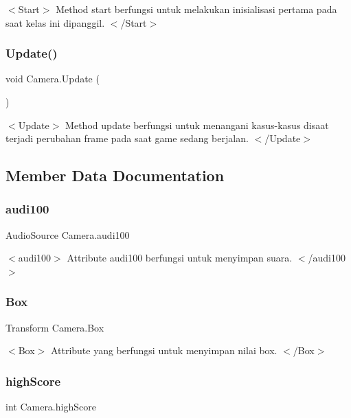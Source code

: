 $<$\+Start$>$ Method start berfungsi untuk melakukan inisialisasi pertama pada saat kelas ini dipanggil. $<$/\+Start$>$ \hypertarget{class_camera_a0dd18d8bd55c82e18a9ef12b036eedab}{}\label{class_camera_a0dd18d8bd55c82e18a9ef12b036eedab} 
\subsubsection{\texorpdfstring{Update()}{Update()}}
{\footnotesize\ttfamily void Camera.\+Update (\begin{DoxyParamCaption}{ }\end{DoxyParamCaption})\hspace{0.3cm}{\ttfamily [private]}}

$<$\+Update$>$ Method update berfungsi untuk menangani kasus-\/kasus disaat terjadi perubahan frame pada saat game sedang berjalan. $<$/\+Update$>$ 

\subsection{Member Data Documentation}
\hypertarget{class_camera_a265abd887260923d3b565aed0688cda7}{}\label{class_camera_a265abd887260923d3b565aed0688cda7} 
\subsubsection{\texorpdfstring{audi100}{audi100}}
{\footnotesize\ttfamily Audio\+Source Camera.\+audi100}

$<$audi100$>$ Attribute audi100 berfungsi untuk menyimpan suara. $<$/audi100$>$ \hypertarget{class_camera_acfd163e2a143a6b425494de9e86c5e00}{}\label{class_camera_acfd163e2a143a6b425494de9e86c5e00} 
\subsubsection{\texorpdfstring{Box}{Box}}
{\footnotesize\ttfamily Transform Camera.\+Box}

$<$\+Box$>$ Attribute yang berfungsi untuk menyimpan nilai box. $<$/\+Box$>$ \hypertarget{class_camera_a91a3b4274da61a63a00782824cf5542e}{}\label{class_camera_a91a3b4274da61a63a00782824cf5542e} 
\subsubsection{\texorpdfstring{high\+Score}{highScore}}
{\footnotesize\ttfamily int Camera.\+high\+Score}

